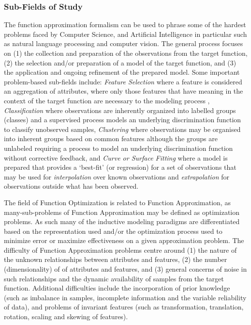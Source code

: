 \documentclass[a4paper, 11pt]{article}
\begin{document}
%
%
\subsubsection{Sub-Fields of Study}
The function approximation formalism can be used to phrase some of the hardest problems faced by Computer Science, and Artificial Intelligence in particular such as natural language processing and computer vision. 
The general process focuses on (1) the collection and preparation of the observations from the target function, (2) the selection and/or preparation of a model of the target function, and (3) the application and ongoing refinement of the prepared model. 
Some important problem-based sub-fields include: \emph{Feature Selection} where a feature is considered an aggregation of attributes, where only those features that have meaning in the context of the target function are necessary to the modeling process \cite{Kudo2000, Guyon2003}, \emph{Classification} where observations are inherently organized into labelled groups (classes) and a supervised process models an underlying discrimination function to classify unobserved samples, \emph{Clustering} where observations may be organised into inherent groups based on common features although the groups are unlabeled requiring a process to model an underlying discrimination function without corrective feedback, and \emph{Curve or Surface Fitting} where a model is prepared that provides a `best-fit' (or regression) for a set of observations that may be used for \emph{interpolation} over known observations and \emph{extrapolation} for observations outside what has been observed.

The field of Function Optimization is related to Function Approximation, as many-sub-problems of Function Approximation may be defined as optimization problems. As such many of the inductive modeling paradigms are differentiated based on the representation used and/or the optimization process used to minimize error or maximize effectiveness on a given approximation problem. 
The difficulty of Function Approximation problems centre around (1) the nature of the unknown relationships between attributes and features, (2) the number (dimensionality) of of attributes and features, and (3) general concerns of noise in such relationships and the dynamic availability of samples from the target function.
Additional difficulties include the incorporation of prior knowledge (such as imbalance in samples, incomplete information and the variable reliability of data), and problems of invariant features (such as transformation, translation, rotation, scaling and skewing of features).
\end{document}
